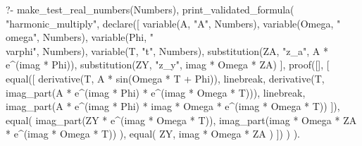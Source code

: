 \begin{prolog}
?-	make_test_real_numbers(Numbers),
	print_validated_formula(
		"harmonic_multiply",
		declare([
			variable(A, "A", Numbers),
			variable(Omega, "\\omega", Numbers),
			variable(Phi, "\\varphi", Numbers),
			variable(T, "t", Numbers),
			substitution(ZA, "z_a", A * e^(imag * Phi)),
			substitution(ZY, "z_y", imag * Omega * ZA)
		],
			proof([],
			[
				equal([
					derivative(T, A * sin(Omega * T + Phi)),
					linebreak,
					derivative(T, imag_part(A * e^(imag * Phi) * e^(imag * Omega * T))),
					linebreak,
					imag_part(A * e^(imag * Phi) * imag * Omega * e^(imag * Omega * T))
				]),
				equal(
					imag_part(ZY * e^(imag * Omega * T)),
					imag_part(imag * Omega * ZA * e^(imag * Omega * T))
				),
				equal(
					ZY,
					imag * Omega * ZA
				)
			])
		)
	).
\end{prolog}
